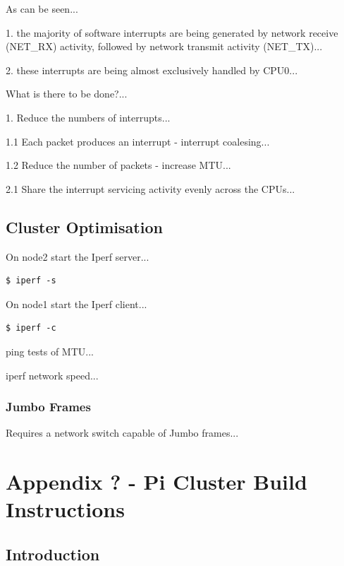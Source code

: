 \documentclass{article}
\begin{document}
As can be seen...

1. the majority of software interrupts are being generated by network receive (NET\_RX) activity, followed by network transmit activity (NET\_TX)...

2. these interrupts are being almost exclusively handled by CPU0...

What is there to be done?...

1. Reduce the numbers of interrupts...

1.1 Each packet produces an interrupt - interrupt coalesing...

1.2 Reduce the number of packets - increase MTU...

2.1 Share the interrupt servicing activity evenly across the CPUs...


%
%
\subsection{Cluster Optimisation}

On node2 start the Iperf server...

\lstset{style=termstyle}
\begin{lstlisting}
$ iperf -s
\end{lstlisting}

On node1 start the Iperf client...

\lstset{style=termstyle}
\begin{lstlisting}
$ iperf -c
\end{lstlisting}

ping tests of MTU...




iperf network speed...

\subsubsection{Jumbo Frames}

Requires a network switch capable of Jumbo frames...


%
%
%
%
\clearpage\section*{Appendix ? - Pi Cluster Build Instructions}

\subsection{Introduction}
\end{document}
